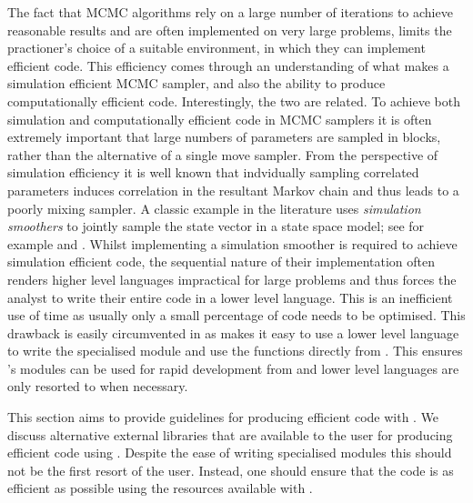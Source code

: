 \documentclass[article]{jss}
\begin{document}
The fact that MCMC algorithms rely on a large number of iterations to
achieve reasonable results and are often implemented on very large
problems, limits the practioner's choice of a suitable environment, in
which they can implement efficient code. This efficiency comes through
an understanding of what makes a simulation efficient MCMC sampler,
and also the ability to produce computationally efficient code.
Interestingly, the two are related. To achieve both simulation and
computationally efficient code in MCMC samplers it is often extremely
important that large numbers of parameters are sampled in blocks,
rather than the alternative of a single move sampler. From the
perspective of simulation efficiency it is well known that indvidually
sampling correlated parameters induces correlation in the resultant
Markov chain and thus leads to a poorly mixing sampler. A classic
example in the literature uses \emph{simulation smoothers }to jointly
sample the state vector in a state space model; see for example
\citet{CarterKohn1994} and \citet{deJongShepard1995}.  Whilst
implementing a simulation smoother is required to achieve simulation
efficient code, the sequential nature of their implementation often
renders higher level languages impractical for large problems and thus
forces the analyst to write their entire code in a lower level
language. This is an inefficient use of time as usually only a small
percentage of code needs to be optimised. This drawback is easily
circumvented in  as  makes it easy to use
a lower level language to write the specialised module and use the
functions directly from . This ensures 's
modules can be used for rapid development from  and
lower level languages are only resorted to when necessary.

This section aims to provide guidelines for producing efficient code
with . We discuss alternative external libraries that are
available to the user for producing efficient code using .
Despite the ease of writing specialised modules this should not be the
first resort of the user. Instead, one should ensure that the
 code is as efficient as possible using the resources
available with .
\end{document}

